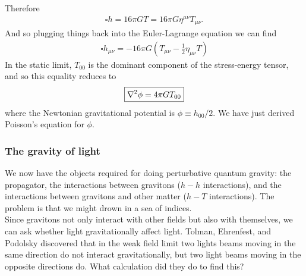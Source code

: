 \documentclass{book}
\theoremstyle{definition}
\newcommand{\f}[2]{\frac{#1}{#2}}
\newcommand{\lp}{\left(}
\newcommand{\rp}{\right)}
\begin{document}
Therefore
\begin{align}
\square h = 16\pi GT = 16\pi G \eta^{\mu\nu}T_{\mu\nu}.
\end{align}
And so plugging things back into the Euler-Lagrange equation we can find 
\begin{align}
\boxed{\square h_{\mu\nu} = -16\pi G \lp T_{\mu\nu} - \f{1}{2}\eta_{\mu\nu}T \rp}
\end{align}
In the static limit, $T_{00}$ is the dominant component of the stress-energy tensor, and so this equality reduces to
\begin{align}
\boxed{\laplacian{\phi}= 4\pi GT_{00}}
\end{align}
where the Newtonian gravitational potential is $\phi \equiv h_{00}/2$. We have just derived Poisson's equation for $\phi$. 




\subsubsection{The gravity of light}


We now have the objects required for doing perturbative quantum gravity: the propagator, the interactions between gravitons ($h-h$ interactions), and the interactions between gravitons and other matter ($h-T$ interactions). The problem is that we might drown in a sea of indices. \\

Since gravitons not only interact with other fields but also with themselves, we can ask whether light gravitationally affect light. Tolman, Ehrenfest, and Podolsky discovered that in the weak field limit two lights beams moving in the same direction do not interact gravitationally, but two light beams moving in the opposite directions do. What calculation did they do to find this?\\
\end{document}
